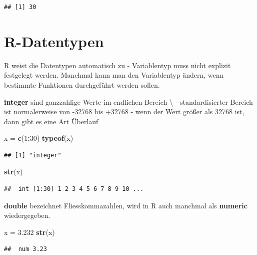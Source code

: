 \documentclass[]{book}
\newenvironment{Shaded}{\begin{snugshade}}{\end{snugshade}}
\newcommand{\KeywordTok}[1]{\textcolor[rgb]{0.13,0.29,0.53}{\textbf{#1}}}
\newcommand{\DecValTok}[1]{\textcolor[rgb]{0.00,0.00,0.81}{#1}}
\newcommand{\FloatTok}[1]{\textcolor[rgb]{0.00,0.00,0.81}{#1}}
\newcommand{\StringTok}[1]{\textcolor[rgb]{0.31,0.60,0.02}{#1}}
\newcommand{\OperatorTok}[1]{\textcolor[rgb]{0.81,0.36,0.00}{\textbf{#1}}}
\newcommand{\NormalTok}[1]{#1}
\begin{document}
\begin{verbatim}
## [1] 30
\end{verbatim}

\section{R-Datentypen}\label{r-datentypen}

R weist die Datentypen automatisch zu - Variablentyp muss nicht explizit
festgelegt werden. Manchmal kann man den Variablentyp ändern, wenn
bestimmte Funktionen durchgeführt werden sollen.

\textbf{integer} sind ganzzahlige Werte im endlichen Bereich
\textbackslash{} - standardisierter Bereich ist normalerweise von -32768
bis +32768 - wenn der Wert größer als 32768 ist, dann gibt es eine Art
Überlauf

\begin{Shaded}
\begin{Highlighting}[]
\NormalTok{x =}\StringTok{ }\KeywordTok{c}\NormalTok{(}\DecValTok{1}\OperatorTok{:}\DecValTok{30}\NormalTok{)}
\KeywordTok{typeof}\NormalTok{(x)}
\end{Highlighting}
\end{Shaded}

\begin{verbatim}
## [1] "integer"
\end{verbatim}

\begin{Shaded}
\begin{Highlighting}[]
\KeywordTok{str}\NormalTok{(x)}
\end{Highlighting}
\end{Shaded}

\begin{verbatim}
##  int [1:30] 1 2 3 4 5 6 7 8 9 10 ...
\end{verbatim}

\textbf{double} bezeichnet Fliesskommazahlen, wird in R auch manchmal
als \textbf{numeric} wiedergegeben.

\begin{Shaded}
\begin{Highlighting}[]
\NormalTok{x =}\StringTok{ }\FloatTok{3.232}
\KeywordTok{str}\NormalTok{(x)}
\end{Highlighting}
\end{Shaded}

\begin{verbatim}
##  num 3.23
\end{verbatim}
\end{document}
